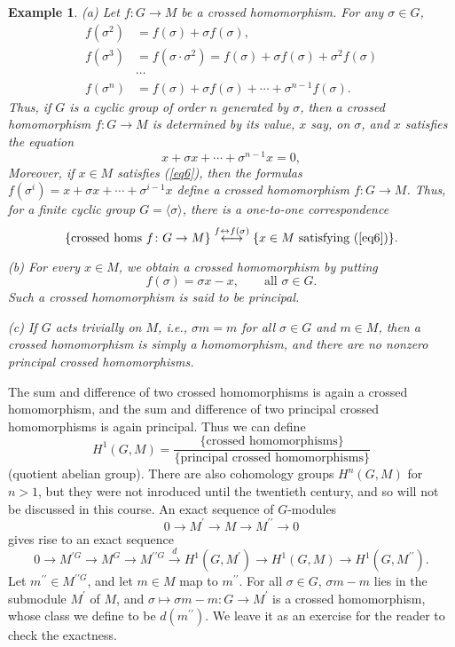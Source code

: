 \documentclass[a4paper,11pt,final,openany]{memoir}
\newtheorem{example}[X]{Example}
\theoremstyle{nonumberplain}
\begin{document}
\begin{example}
\label{ag16} (a) Let $f\colon G\rightarrow M$ be a crossed homomorphism. For
any $\sigma\in G$,
\begin{align*}
f(\sigma^{2})  &  =f(\sigma)+\sigma f(\sigma),\\
f(\sigma^{3})  &  =f(\sigma\cdot\sigma^{2})=f(\sigma)+\sigma f(\sigma
)+\sigma^{2}f(\sigma)\\
&  \cdots\\
f(\sigma^{n})  &  =f(\sigma)+\sigma f(\sigma)+\cdots+\sigma^{n-1}f(\sigma).
\end{align*}
Thus, if $G$ is a cyclic group of order $n$ generated by $\sigma$, then a
crossed homomorphism $f\colon G\rightarrow M$ is determined by its value, $x$
say, on $\sigma$, and $x$ satisfies the equation
\begin{equation}
x+\sigma x+\cdots+\sigma^{n-1}x=0, \label{eq6}%
\end{equation}
Moreover, if $x\in M$ satisfies (\ref{eq6}), then the formulas $f(\sigma
^{i})=x+\sigma x+\cdots+\sigma^{i-1}x$ define a crossed homomorphism $f\colon
G\rightarrow M$. Thus, for a finite cyclic group $G=\langle\sigma\rangle$,
there is a one-to-one correspondence
\[
\{\text{crossed homs }f\colon G\rightarrow M\}\overset{f\leftrightarrow
f(\sigma)}{\longleftrightarrow}\{x\in M\text{\ satisfying (\ref{eq6})}\}.
\]


(b) For every $x\in M$, we obtain a crossed homomorphism by putting
\[
f(\sigma)=\sigma x-x,\qquad\text{all }\sigma\in G.
\]
Such a crossed homomorphism is said to be \emph{principal}.
%


(c) If $G$ acts trivially on $M$, i.e., $\sigma m=m$ for all $\sigma\in G$ and
$m\in M$, then a crossed homomorphism is simply a homomorphism, and there are
no nonzero principal crossed homomorphisms.
\end{example}

The sum and difference of two crossed homomorphisms is again a crossed
homomorphism, and the sum and difference of two principal crossed
homomorphisms is again principal. Thus we can define
\[
H^{1}(G,M)=\frac{\{\text{crossed homomorphisms}\}}{\{\text{principal crossed
homomorphisms}\}}%
\]
(quotient abelian group). There are also cohomology groups%
$H^{n}(G,M)$ for $n>1$, but they were not inroduced until the twentieth
century, and so will not be discussed in this course. An exact sequence of
$G$-modules%
\[
0\rightarrow M^{\prime}\rightarrow M\rightarrow M^{\prime\prime}\rightarrow0
\]
gives rise to an exact sequence%
\[
0\longrightarrow M^{\prime G}\longrightarrow M^{G}\longrightarrow
M^{\prime\prime G}\overset{d}{\longrightarrow}H^{1}(G,M^{\prime}%
)\longrightarrow H^{1}(G,M)\longrightarrow H^{1}(G,M^{\prime\prime}).
\]
Let $m^{\prime\prime}\in M^{\prime\prime G}$, and let $m\in M$ map to
$m^{\prime\prime}$. For all $\sigma\in G$, $\sigma m-m$ lies in the submodule
$M^{\prime}$ of $M$, and $\sigma\mapsto\sigma m-m\colon G\rightarrow
M^{\prime}$ is a crossed homomorphism, whose class we define to be
$d(m^{\prime\prime})$. We leave it as an exercise for the reader to check the exactness.
\end{document}
